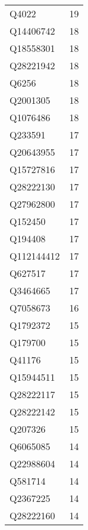 \begin{tabular}{lr}
       Q4022 &                            19 \\
   Q14406742 &                            18 \\
   Q18558301 &                            18 \\
   Q28221942 &                            18 \\
       Q6256 &                            18 \\
    Q2001305 &                            18 \\
    Q1076486 &                            18 \\
     Q233591 &                            17 \\
   Q20643955 &                            17 \\
   Q15727816 &                            17 \\
   Q28222130 &                            17 \\
   Q27962800 &                            17 \\
     Q152450 &                            17 \\
     Q194408 &                            17 \\
  Q112144412 &                            17 \\
     Q627517 &                            17 \\
    Q3464665 &                            17 \\
    Q7058673 &                            16 \\
    Q1792372 &                            15 \\
     Q179700 &                            15 \\
      Q41176 &                            15 \\
   Q15944511 &                            15 \\
   Q28222117 &                            15 \\
   Q28222142 &                            15 \\
     Q207326 &                            15 \\
    Q6065085 &                            14 \\
   Q22988604 &                            14 \\
     Q581714 &                            14 \\
    Q2367225 &                            14 \\
   Q28222160 &                            14 \\

\end{tabular}
